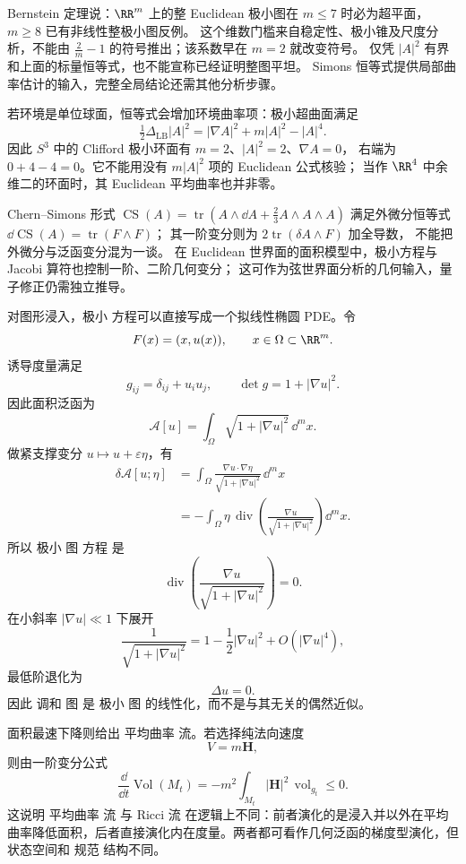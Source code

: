 \begin{note}
Bernstein 定理说：$\RR^m$ 上的整 Euclidean 极小图在 $m\le7$ 时必为超平面，
$m\ge8$ 已有非线性整极小图反例。
这个维数门槛来自稳定性、极小锥及尺度分析，不能由
$\tfrac2m-1$ 的符号推出；该系数早在 $m=2$ 就改变符号。
仅凭 $|A|^2$ 有界和上面的标量恒等式，也不能宣称已经证明整图平坦。
Simons 恒等式提供局部曲率估计的输入，完整全局结论还需其他分析步骤。

若环境是单位球面，恒等式会增加环境曲率项：极小超曲面满足
\[
\tfrac12\Delta_{\mathrm{LB}}|A|^2
=|\nabla A|^2+m|A|^2-|A|^4.
\]
因此 $S^3$ 中的 Clifford 极小环面有 $m=2$、$|A|^2=2$、$\nabla A=0$，
右端为 $0+4-4=0$。它不能用没有 $m|A|^2$ 项的 Euclidean 公式核验；
当作 $\RR^4$ 中余维二的环面时，其 Euclidean 平均曲率也并非零。

Chern--Simons 形式
$\operatorname{CS}(A)=\operatorname{tr}(A\wedge\dd A+\tfrac23A\wedge A\wedge A)$
满足外微分恒等式 $\dd\operatorname{CS}(A)=\operatorname{tr}(F\wedge F)$；
其一阶变分则为 $2\operatorname{tr}(\delta A\wedge F)$ 加全导数，
不能把外微分与泛函变分混为一谈。
在 Euclidean 世界面的面积模型中，极小方程与 Jacobi 算符也控制一阶、二阶几何变分；
这可作为弦世界面分析的几何输入，量子修正仍需独立推导。
\end{note}

对图形浸入，极小 方程可以直接写成一个拟线性椭圆 PDE。令
\[
F(x)=(x,u(x)),
\qquad x\in\Omega\subset\RR^m.
\]
诱导度量满足
\[
g_{ij}=\delta_{ij}+u_i u_j,
\qquad
\det g=1+|\nabla u|^2.
\]
因此面积泛函为
\begin{equation*}\mathcal A[u]
=\int_\Omega\sqrt{1+|\nabla u|^2}\,\dd^m x.\end{equation*}
做紧支撑变分 $u\mapsto u+\varepsilon\eta$，有
\[
\begin{aligned}
\delta\mathcal A[u;\eta]
&=\int_\Omega
\frac{\nabla u\cdot\nabla\eta}
{\sqrt{1+|\nabla u|^2}}\,\dd^mx\\
&=-\int_\Omega
\eta\,
\operatorname{div}\left(
\frac{\nabla u}{\sqrt{1+|\nabla u|^2}}
\right)\dd^mx.
\end{aligned}
\]
所以 极小 图 方程 是
\begin{equation*}\boxed{
\operatorname{div}\left(
\frac{\nabla u}{\sqrt{1+|\nabla u|^2}}
\right)=0
}.\end{equation*}
在小斜率 $|\nabla u|\ll1$ 下展开
\[
\frac{1}{\sqrt{1+|\nabla u|^2}}
=1-\frac12|\nabla u|^2+O(|\nabla u|^4),
\]
最低阶退化为
\[
\Delta u=0.
\]
因此 调和 图 是 极小 图 的线性化，而不是与其无关的偶然近似。

面积最速下降则给出 平均曲率 流。若选择纯法向速度
\[
V=m\mathbf H,
\]
则由一阶变分公式
\[
\frac{\dd}{\dd t}\operatorname{Vol}(M_t)
=-m^2\int_{M_t}|\mathbf H|^2\,\operatorname{vol}_{g_t}\le0.
\]
这说明 平均曲率 流 与 Ricci 流 在逻辑上不同：前者演化的是浸入并以外在平均曲率降低面积，后者直接演化内在度量。两者都可看作几何泛函的梯度型演化，但状态空间和 规范 结构不同。

